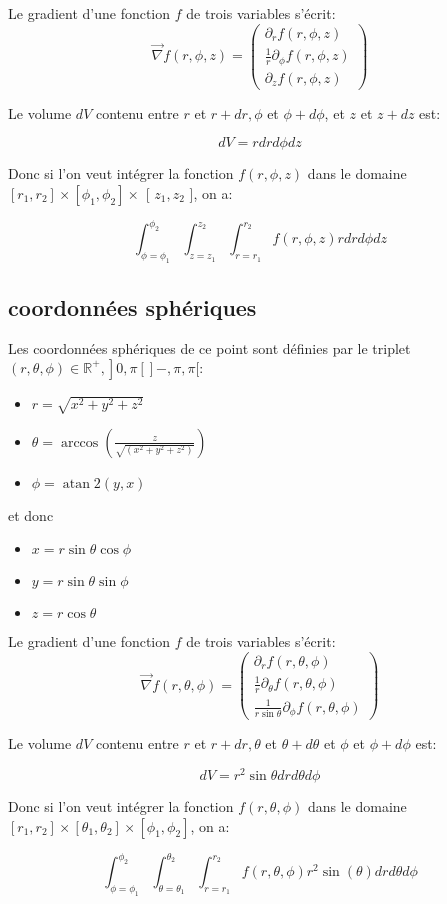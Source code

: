 Le gradient d'une fonction $f$ de trois variables s'écrit:
$$
\vec{\nabla} f(r, \phi, z)=\left(\begin{array}{c}
\partial_r f(r, \phi, z) \\
\frac{1}{r} \partial_\phi f(r, \phi, z) \\
\partial_z f(r, \phi, z)
\end{array}\right)
$$

Le volume $d V$ contenu entre $r$ et $r+d r, \phi$ et $\phi+d \phi$, et $z$ et $z+d z$ est:

$$
d V=r d r d \phi d z
$$


Donc si l'on veut intégrer la fonction $f(r, \phi, z)$ dans le domaine $\left[r_1, r_2\right] \times\left[\phi_1, \phi_2\right] \times$ [ $z_1, z_2$ ], on a:

$$
\int_{\phi=\phi_1}^{\phi_2} \int_{z=z_1}^{z_2} \int_{r=r_1}^{r_2} f(r, \phi, z) r d r d \phi d z
$$
\subsection*{coordonnées sphériques}
Les coordonnées sphériques de ce point sont définies par le triplet $(r, \theta, \phi) \in \left.\mathbb{R}^{+},\right] 0, \pi[]-,\pi, \pi[:$

\begin{itemize}
    \item $r=\sqrt{x^2+y^2+z^2}$
    \item $\theta=\arccos \left(\frac{z}{\sqrt{\left(x^2+y^2+z^2\right)}}\right)$
    \item $\phi=\operatorname{atan} 2(y, x)$
\end{itemize}
et donc 
\begin{itemize}
    \item $x=r \sin \theta \cos \phi$
    \item $y=r \sin \theta \sin \phi$
    \item $z=r \cos \theta$
\end{itemize}

Le gradient d'une fonction $f$ de trois variables s'écrit:
$$
\vec{\nabla} f(r, \theta, \phi)=\left(\begin{array}{c}
\partial_r f(r, \theta, \phi) \\
\frac{1}{r} \partial_\theta f(r, \theta, \phi) \\
\frac{1}{r \sin \theta} \partial_\phi f(r, \theta, \phi)
\end{array}\right)
$$

Le volume $d V$ contenu entre $r$ et $r+d r, \theta$ et $\theta+d \theta$ et $\phi$ et $\phi+d \phi$ est:

$$
d V=r^2 \sin \theta d r d \theta d \phi
$$


Donc si l'on veut intégrer la fonction $f(r, \theta, \phi)$ dans le domaine $\left[r_1, r_2\right] \times\left[\theta_1, \theta_2\right] \times \left[\phi_1, \phi_2\right]$, on a:

$$
\int_{\phi=\phi_1}^{\phi_2} \int_{\theta=\theta_1}^{\theta_2} \int_{r=r_1}^{r_2} f(r, \theta, \phi) r^2 \sin (\theta) d r d \theta d \phi
$$
